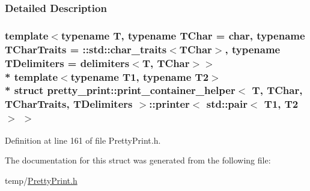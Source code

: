 \subsubsection{Detailed Description}
\subsubsection*{template$<$typename T, typename T\+Char = char, typename T\+Char\+Traits = \+::std\+::char\+\_\+traits$<$\+T\+Char$>$, typename T\+Delimiters = delimiters$<$\+T, T\+Char$>$$>$\\*
template$<$typename T1, typename T2$>$\\*
struct pretty\+\_\+print\+::print\+\_\+container\+\_\+helper$<$ T, T\+Char, T\+Char\+Traits, T\+Delimiters $>$\+::printer$<$ std\+::pair$<$ T1, T2 $>$ $>$}



Definition at line 161 of file Pretty\+Print.\+h.



The documentation for this struct was generated from the following file\+:\begin{DoxyCompactItemize}
\item 
temp/\hyperlink{PrettyPrint_8h}{Pretty\+Print.\+h}\end{DoxyCompactItemize}
